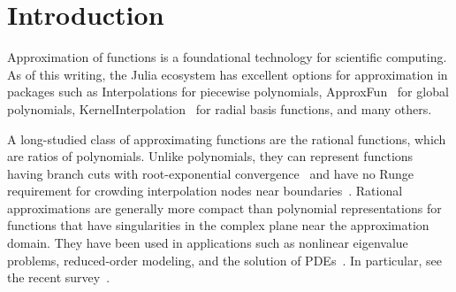 \documentclass{juliacon}
\begin{document}


\maketitle

\begin{abstract}
Unlike polynomials, rational functions can represent functions having poles or branch cuts with root-exponential convergence and no Runge phenomenon. Recent developments of the AAA and greedy continued fraction algorithms have sparked renewed interest in computational rational approximation. The \textsf{RationalFunctionApproximation} package supplies the fastest known implementations of these methods and the only arbitrary-precision ones. Combined with the \textsf{ComplexRegions} package, it can produce compact and accurate representations of a huge variety of functions over intervals, circles, or other domains in the complex plane.
\end{abstract}

\section{Introduction}

Approximation of functions is a foundational technology for scientific computing. As of this writing, the Julia ecosystem has excellent options for approximation in packages such as \textsf{Interpolations} \cite{kittisopikulInterpolationsjl2025} for piecewise polynomials, \textsf{ApproxFun}~\cite{olverPracticalFramework2014} for global polynomials, \textsf{KernelInterpolation}~\cite{lampertKernelInterpolationjlMultivariate2024} for radial basis functions, and many others.

A long-studied class of approximating functions are the rational functions, which are ratios of polynomials. Unlike polynomials, they can represent functions having branch cuts with root-exponential convergence~\cite{newmanRationalApproximation1964, herremansResolutionSingularities2023} and have no Runge requirement for crowding interpolation nodes near boundaries~\cite{platteImpossibilityFast2011}. Rational approximations are generally more compact than polynomial representations for functions that have singularities in the complex plane near the approximation domain. They have been used in applications such as nonlinear eigenvalue problems, reduced-order modeling, and the solution of PDEs~\cite{antoulasInterpolatoryMethods2020,budisaRationalApproximation2022,gopalSolvingLaplace2019,hautSolvingBurgers2013,lietaertAutomaticRational2022,rodriguezPAAAAlgorithm2023,trefethenNumericalConformal2020}. In particular, see the recent survey~\cite{NakatsukasaApplicationsAAA2026}.
\end{document}
